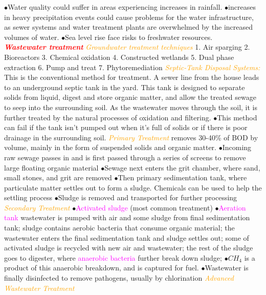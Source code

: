 \documentclass{article}
\newcommand{\ddd}{$\bullet$}
\newcommand{\red}[1]{\textcolor{red}{#1}}
\newcommand{\pink}[1]{\textcolor{magenta}{#1}}
\newcommand{\orange}[1]{\textcolor{orange}{#1}}
\newcommand{\mysection}[1]{\textbf{\textit{\red{#1}}}}
\newcommand{\mysubsection}[1]{{\textit{\orange{#1}}}}
\newcommand{\vocab}[1]{{\pink{#1}}}
\begin{document}
\begin{multicols*}{4}
	        \ddd Water quality could suffer in areas experiencing increases in rainfall.
	        \ddd increases in heavy precipitation events could cause problems for the water infrastructure, as sewer systems and water treatment plants are overwhelmed by the increased volumes of water. 
	        \ddd Sea level rise face risks to freshwater resources.
	 \\
    \mysection{Wastewater treatment}
        \mysubsection{Groundwater treatment techniques}
             1. Air sparging 2. Bioreactors 3. Chemical oxidation 4. Constructed wetlands 5. Dual phase extraction 6. Pump and treat 7. Phytoremediation
        \mysubsection{Septic-Tank Disposal Systems: }
            This is the conventional method for treatment. A sewer line from the house leads to an underground septic tank in the yard. This tank is designed to separate solids from liquid, digest and store organic matter, and allow the treated sewage to seep into the surrounding soil. As the wastewater moves through the soil, it is further treated by the natural processes of oxidation and filtering.
            \ddd This method can fail if the tank isn't pumped out when it's full of solids or if there is poor drainage in the surrounding soil.
        \mysubsection{Primary Treatment} 
            removes 30-40\% of BOD by volume, mainly in the form of suspended solids and organic matter. 
            \ddd Incoming raw sewage passes in and is first passed through a series of screens to remove large floating organic material
            \ddd Sewage next enters the grit chamber, where sand, small stones, and grit are removed
            \ddd Then primary sedimentation tank, where particulate matter settles out to form a sludge. Chemicals can be used to help the settling process
            \ddd Sludge is removed and transported for further processing
    	 \mysubsection{Secondary Treatment}
    	    \ddd \vocab{Activated sludge} (most common treatment)
    	    \ddd \vocab{Aeration tank} wastewater is pumped with air and some sludge from final sedimentation tank; sludge contains aerobic bacteria that consume organic material; the wastewater enters the final sedimentation tank and sludge settles out; some of activated sludge is recycled with new air and wastewater; the rest of the sludge goes to digester, where \vocab{anaerobic bacteria} further break down sludge;
    	    \ddd $CH_4$ is a product of this anaerobic breakdown, and is captured for fuel. 
    	    \ddd Wastewater is finally disinfected to remove pathogens, usually by chlorination
    	  \mysubsection{Advanced Wastewater Treatment}

\end{multicols*}
\end{document}
